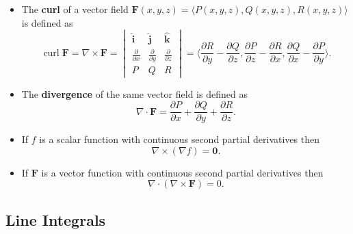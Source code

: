 \documentclass{article}
\newcommand{\curl}{\operatorname{curl}}
\begin{document}
\begin{itemize}
  \item The \textbf{curl} of a vector field $\mathbf{F}(x, y, z) = \langle P(x, y, z), Q(x, y, z), R(x, y, z) \rangle$ is defined as \[\curl \mathbf{F} = \nabla \times \mathbf{F} = \begin{vmatrix}
            \hat{\mathbf{i}}            & \hat{\mathbf{j}}            & \hat{\mathbf{k}}            \\
            \frac{\partial}{\partial x} & \frac{\partial}{\partial y} & \frac{\partial}{\partial z} \\
            P                           & Q                           & R
          \end{vmatrix} = \langle \frac{\partial R}{\partial y} - \frac{\partial Q}{\partial z}, \frac{\partial P}{\partial z} - \frac{\partial R}{\partial x}, \frac{\partial Q}{\partial x} - \frac{\partial P}{\partial y} \rangle.\]

  \item The \textbf{divergence} of the same vector field is defined as \[\nabla \cdot \mathbf{F} = \frac{\partial P}{\partial x} + \frac{\partial Q}{\partial y} + \frac{\partial R}{\partial z}.\]

  \item If $f$ is a scalar function with continuous second partial derivatives then \[\nabla \times (\nabla f) = \mathbf{0}.\]

  \item If $\mathbf{F}$ is a vector function with continuous second partial derivatives then \[\nabla \cdot (\nabla \times \mathbf{F}) = 0.\]
\end{itemize}

\subsection{Line Integrals}
\end{document}
